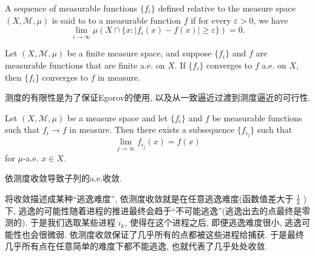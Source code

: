 \documentclass[../main.tex]{subfiles}
\begin{document}
\begin{definition}{}{}
A sequence of measurable functions $\{f_i\}$ defined relative to the measure space $(X, \mathcal{M}, \mu)$ is said to  to a measurable function $f$ if for every $\varepsilon > 0$, we have
$$
\lim_{i \to \infty} \mu(X \cap \{x : |f_i(x) - f(x)| \geq \varepsilon\}) = 0.
$$
\end{definition}
\begin{theorem}{}{}
Let $(X, \mathcal{M}, \mu)$ be a finite measure space, and suppose $\{f_i\}$ and $f$ are measurable functions that are finite a.e. on $X$. If $\{f_i\}$ converges to $f$ a.e. on $X$, then $\{f_i\}$ converges to $f$ in measure.
\end{theorem}
\begin{remark}
    测度的有限性是为了保证Egorov的使用, 以及从一致逼近过渡到测度逼近的可行性.
\end{remark}
\begin{theorem}{}{}
Let $(X, \mathcal{M}, \mu)$ be a measure space and let $\{f_i\}$ and $f$ be measurable functions such that $f_i \to f$ in measure. Then there exists a subsequence $\{f_{i_j}\}$ such that
\[
\lim_{j\to\infty} f_{i_j}(x) = f(x)
\]
for $\mu$-a.e. $x \in X$.
\end{theorem}
\begin{remark}
    依测度收敛导致子列的a.e.收敛.
\end{remark}
\begin{proofsketch}
    将收敛描述成某种``逃逸难度'', 依测度收敛就是在任意逃逸难度(函数值差大于 \(  \frac{1 }{k }   \) )下, 逃逸的可能性随着进程的推进最终会趋于``不可能逃逸''(逃逸出去的点最终是零测的). 于是我们选取某些进程 \(  i_{k}  \), 使得在这个进程之后, 即便逃逸难度很小, 逃逸可能性也会很微弱. 依测度收敛保证了几乎所有的点都被这些进程给捕获. 于是最终几乎所有点在任意简单的难度下都不能逃逸, 也就代表了几乎处处收敛.
\end{proofsketch}
\end{document}
